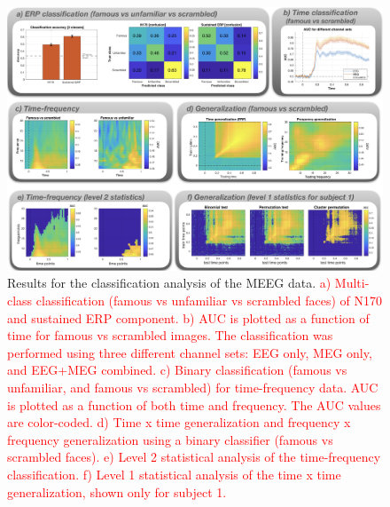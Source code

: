\documentclass[utf8]{frontiersSCNS} %
\newcommand{\red}[1]{\textcolor{red}{#1}}
\begin{document}
\begin{figure}[ht!]
\centering\includegraphics[width=\linewidth]{MVPA_results}
\caption{Results for the classification analysis of the \cite{Wakeman2015ADataset} MEEG data. \red{a) Multi-class classification (famous vs unfamiliar vs scrambled faces) of N170 and sustained ERP component. b) AUC is plotted as a function of time for famous vs scrambled images. The classification was performed using three different channel sets: EEG  only, MEG only, and EEG+MEG combined. c) Binary classification (famous vs unfamiliar, and famous vs scrambled) for time-frequency data. AUC is plotted as a function of both time and frequency. The AUC values are color-coded. d) Time x time generalization and frequency x frequency generalization using a binary classifier (famous vs scrambled faces). e) Level 2 statistical analysis of the time-frequency classification. f) Level 1 statistical analysis of the time x time generalization, shown only for subject 1.} }\label{fig:results}
\end{figure}
\end{document}
